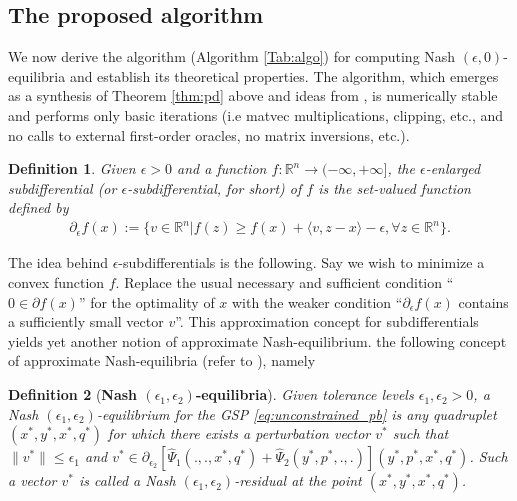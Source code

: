 \documentclass[a4paper,9pt]{extarticle}
\newtheorem{definition}{Definition}
\begin{document}
\subsection{The proposed algorithm}
We now derive the algorithm (Algorithm \ref{Tab:algo}) for computing
Nash $(\epsilon, 0)$-equilibria and establish its theoretical
properties. The algorithm, which emerges as a synthesis of Theorem
\ref{thm:pd} above and ideas from \cite{he2013accelerating},  is
numerically stable and performs only basic iterations (i.e matvec
multiplications, clipping, etc., and no calls to external first-order
oracles, no matrix inversions, etc.).
\label{sec:algo}
\begin{definition}
  Given $\epsilon > 0$ and a function $f:\mathbb{R}^n
  \rightarrow (-\infty,+\infty]$, the $\epsilon$-enlarged
  subdifferential (or
  $\epsilon$-subdifferential, for short) of $f$ is the set-valued
  function defined by
  \begin{eqnarray}
\partial_\epsilon f(x):= \{v \in \mathbb{R}^n | f(z)
\ge f(x) + \langle v, z - x\rangle - \epsilon,\forall z \in
\mathbb{R}^n\}.
\end{eqnarray}
\end{definition}
The idea behind $\epsilon$-subdifferentials is the following. Say we wish
to minimize a convex function $f$. Replace the usual
necessary and sufficient condition ``$0 \in \partial f(x)$'' for the
optimality of $x$ with the weaker condition ``$\partial_\epsilon f(x)$
contains a sufficiently small vector $v$''. %
This approximation concept for subdifferentials yields yet another notion
of approximate Nash-equilibrium.
the following concept of approximate Nash-equilibria (refer to
\cite{he2013accelerating}), namely

\begin{definition}[\textbf{Nash $(\epsilon_1,\epsilon_2)$-equilibria}]
Given tolerance levels $\epsilon_1, \epsilon_2 > 0$, a Nash
$(\epsilon_1,\epsilon_2)$-equilibrium for the GSP \eqref{eq:unconstrained_pb}
is any quadruplet $(x^*, y^*, x^*, q^*)$ for which
there exists a perturbation vector $v^*$ such that
$\|v^*\| \le \epsilon_1$ and $v^* \in
\partial_{\epsilon_2}[\hat{\Psi}_1(., ., x^*, q^*) +
  \hat{\Psi}_2(y^*, p^*, ., .)](y^*,p^*,x^*,q^*)$.
Such a vector $v^*$ is called a Nash $(\epsilon_1,
\epsilon_2)$-residual at the point $(x^*,
y^*, x^*, q^*)$.
\label{thm:cool_notion}
\end{definition}
\end{document}

